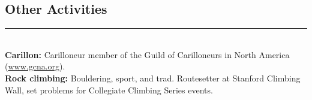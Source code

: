 \documentclass[margin]{res}
\begin{document}
\begin{resume}
\vspace{1pt}\section{Other Activities} \vspace{-15pt} \rule{\textwidth}{0.5pt} \\[3pt]
{\bf Carillon:} Carilloneur member of the Guild of Carilloneurs in North America (\url{www.gcna.org}). \\[3pt]
{\bf Rock climbing:} Bouldering, sport, and trad. Routesetter at Stanford Climbing Wall, set problems for Collegiate Climbing Series events.

\end{resume}
\end{document}
